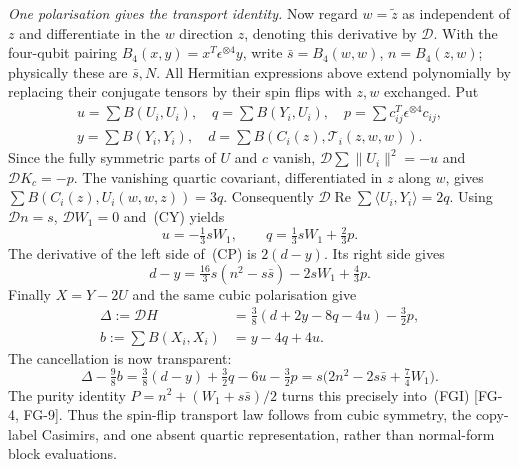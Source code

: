 \emph{One polarisation gives the transport identity.}
Now regard $w=\tilde z$ as independent of $z$ and differentiate in the
$w$ direction $z$, denoting this derivative by $\mathcal D$.
With the four-qubit pairing $B_4(x,y)=x^T\epsilon^{\otimes4}y$, write $\bar s=B_4(w,w)$, $n=B_4(z,w)$; physically these are $\bar s,N$.
All Hermitian expressions above extend polynomially by replacing their
conjugate tensors by their spin flips with $z,w$ exchanged.
Put
\[
\begin{gathered}
 u=\sum B(U_i,U_i),\quad q=\sum B(Y_i,U_i),\quad
 p=\sum c_{ij}^T\epsilon^{\otimes4}c_{ij},\\
 y=\sum B(Y_i,Y_i),\quad d=\sum B(C_i(z),\mathcal T_i(z,w,w)).
\end{gathered}
\]
Since the fully symmetric parts of $U$ and $c$ vanish,
$\mathcal D\sum\|U_i\|^2=-u$ and $\mathcal DK_c=-p$.
The vanishing quartic covariant, differentiated in $z$ along $w$, gives
$\sum B(C_i(z),U_i(w,w,z))=3q$.
Consequently $\mathcal D\operatorname{Re}\sum\langle U_i,Y_i\rangle=2q$.
Using $\mathcal Dn=s$, $\mathcal DW_1=0$ and~(CY) yields
\[
 u=-\tfrac13sW_1,\qquad q=\tfrac13sW_1+\tfrac23p.
\]
The derivative of the left side of~(CP) is $2(d-y)$.
Its right side gives
\[
 d-y=\tfrac{16}{3}s(n^2-s\bar s)-2sW_1+\tfrac43p.
\]
Finally $X=Y-2U$ and the same cubic polarisation give
\[
 \begin{aligned}
 \Delta:=\mathcal DH&=\tfrac38(d+2y-8q-4u)-\tfrac32p,\\
 b:=\sum B(X_i,X_i)&=y-4q+4u.
 \end{aligned}
\]
The cancellation is now transparent:
\[
 \Delta-\tfrac98b=\tfrac38(d-y)+\tfrac32q-6u-\tfrac32p
 =s\bigl(2n^2-2s\bar s+\tfrac74W_1\bigr).
\]
The purity identity $P=n^2+(W_1+s\bar s)/2$ turns this precisely into~(FGI) [FG-4, FG-9].
Thus the spin-flip transport law follows from cubic symmetry, the copy-label
Casimirs, and one absent quartic representation, rather than normal-form
block evaluations.
